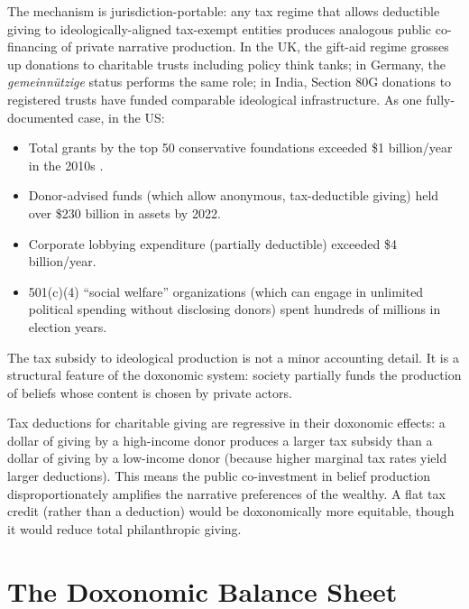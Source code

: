 \begin{example}
\label{ex:hidden-transfers}
The mechanism is jurisdiction-portable: any tax regime that allows deductible giving to ideologically-aligned tax-exempt entities produces analogous public co-financing of private narrative production. In the UK, the gift-aid regime grosses up donations to charitable trusts including policy think tanks; in Germany, the \emph{gemeinn{\"u}tzige} status performs the same role; in India, Section 80G donations to registered trusts have funded comparable ideological infrastructure. As one fully-documented case, in the US:
\begin{itemize}[nosep]
  \item Total grants by the top 50 conservative foundations exceeded \$1 billion/year in the 2010s \autocite{mayer2016}.
  \item Donor-advised funds (which allow anonymous, tax-deductible giving) held over \$230 billion in assets by 2022.
  \item Corporate lobbying expenditure (partially deductible) exceeded \$4 billion/year.
  \item 501(c)(4) ``social welfare'' organizations (which can engage in unlimited political spending without disclosing donors) spent hundreds of millions in election years.
\end{itemize}
The tax subsidy to ideological production is not a minor accounting detail.
It is a structural feature of the doxonomic system: society partially funds the production of beliefs whose content is chosen by private actors.
\end{example}

\begin{remark}
\label{rem:regressive}
Tax deductions for charitable giving are regressive in their doxonomic effects: a dollar of giving by a high-income donor produces a larger tax subsidy than a dollar of giving by a low-income donor (because higher marginal tax rates yield larger deductions).
This means the public co-investment in belief production disproportionately amplifies the narrative preferences of the wealthy.
A flat tax credit (rather than a deduction) would be doxonomically more equitable, though it would reduce total philanthropic giving.
\end{remark}


\section{The Doxonomic Balance Sheet}
\label{sec:ch10-balance}

